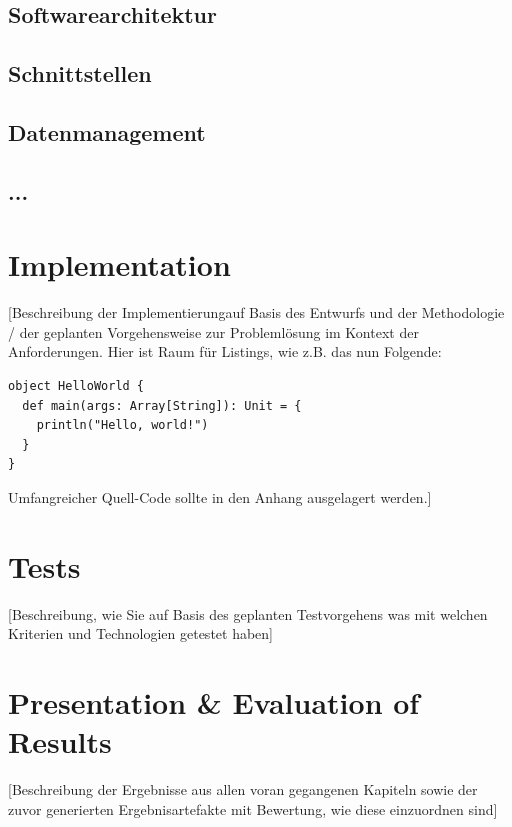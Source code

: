 \documentclass[oneside,bibliography=totocnumbered,BCOR=5mm]{scrbook}%
\theoremstyle{definition}
\theoremstyle{definition}
\theoremstyle{definition}
\theoremstyle{definition}
\theoremstyle{definition}
\theoremstyle{definition}
\begin{document}
\section{Softwarearchitektur}
\section{Schnittstellen}
\section{Datenmanagement}
\section{...}



\chapter{Implementation}

[Beschreibung der Implementierung\footnotemark auf Basis des Entwurfs und der Methodologie / der geplanten Vorgehensweise zur Probleml\"osung im Kontext der Anforderungen. Hier ist Raum f\"ur Listings, wie z.B. das nun Folgende:



\begin{lstlisting}[caption={Ein Beispiel: Hello World (Scala)}]
object HelloWorld {
  def main(args: Array[String]): Unit = {
    println("Hello, world!")
  }
}
\end{lstlisting}

Umfangreicher Quell-Code sollte in den Anhang ausgelagert werden.]


\chapter{Tests}
[Beschreibung, wie Sie auf Basis des geplanten Testvorgehens was mit welchen Kriterien und Technologien getestet haben]

\chapter{Presentation & Evaluation of Results}
[Beschreibung der Ergebnisse aus allen voran gegangenen Kapiteln sowie der zuvor generierten Ergebnisartefakte mit Bewertung, wie diese einzuordnen sind]
\end{document}
